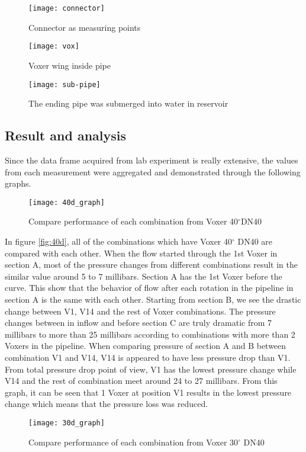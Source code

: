 \begin{figure}[!htb]
   \begin{minipage}{0.48\textwidth}
     \centering
     \texttt{[image: connector]}
     \caption{Connector as measuring points}\label{fig:connector}
   \end{minipage}\hfill
   \begin {minipage}{0.48\textwidth}
     \centering
     \texttt{[image: vox]}
     \caption{Voxer wing inside pipe}\label{fig:vox}
   \end{minipage}
\end{figure}


\begin{figure}[h]
  \centering
  \texttt{[image: sub-pipe]}
  \caption{ The ending pipe was submerged into water in reservoir}
  \label{fig:subpipe}
\end{figure}

\subsection{Result and analysis}

Since the data frame acquired from lab experiment is really extensive, the values from each measurement were aggregated and demonstrated through the following graphs.

\begin{figure}[h!]
  \centering
  \texttt{[image: 40d\_graph]}
  \caption{ Compare performance of each combination from Voxer 40$^{\circ}$DN40}
  \label{fig:40d}
\end{figure}

In figure \vref{fig:40d}, all of the combinations which have Voxer 40$^{\circ}$ DN40 are compared with each other. When the flow started through the 1st Voxer in section A, most of the pressure changes from different combinations result in the similar value around 5 to 7 millibars. Section A has the 1st Voxer before the curve. This show that the behavior of flow after each rotation in the pipeline in section A is the same with each other. Starting from section B, we see the drastic change between V1, V14 and the rest of Voxer combinations. The pressure changes between in inflow and before section C are truly dramatic from 7 millibars to more than 25 millibars according to combinations with more than 2 Voxers in the pipeline. When comparing pressure of section A and B between combination V1 and V14, V14 is appeared to have less pressure drop than V1. From total pressure drop point of view, V1 has the lowest pressure change while V14 and the rest of combination meet around 24 to 27 millibars. From this graph, it can be seen that 1 Voxer at position V1 results in the lowest pressure change which means that the pressure loss was reduced. 
\begin{figure}[h!]
  \centering
  \texttt{[image: 30d\_graph]}
  \caption{Compare performance of each combination from Voxer 30$^{\circ}$ DN40}
  \label{fig:30d}
\end{figure}

